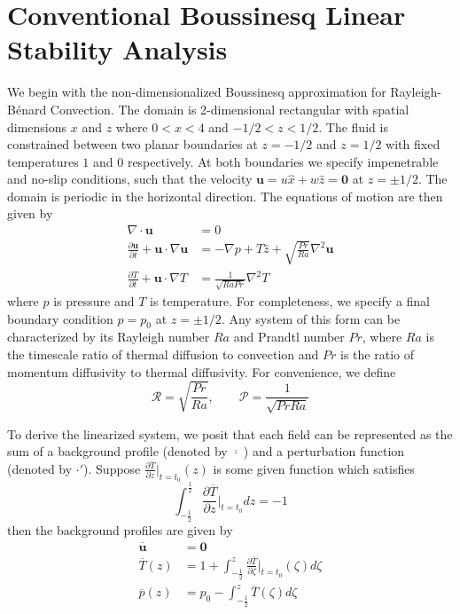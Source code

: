 \documentclass[twocolumn,showpacs,amsmath,amssymb]{revtex4}
\def\hat{\widehat}
\def\bar{\overline}
\begin{document}
\section{Conventional Boussinesq Linear Stability Analysis}\label{sec:boussinesq}
We begin with the non-dimensionalized Boussinesq approximation for Rayleigh-Bénard Convection. The domain is 2-dimensional rectangular with spatial dimensions $x$ and $z$ where $0 < x < 4$ and $-1/2 < z < 1/2$. The fluid is constrained between two planar boundaries at $z = -1/2$ and $z = 1/2$ with fixed temperatures $1$ and $0$ respectively. At both boundaries we specify impenetrable and no-slip conditions, such that the velocity $\mathbf{u} = u \hat{x} + w \hat{z} = \mathbf{0}$ at $z = \pm 1/2$. The domain is periodic in the horizontal direction. The equations of motion are then given by
\begin{align}
    \nabla \cdot \mathbf{u} &= 0 \label{EQ:motion1}\\
    \frac{\partial \mathbf{u}}{\partial t} + \mathbf{u} \cdot \nabla \mathbf{u} &= - \nabla p + T \hat{z} + \sqrt{\frac{Pr}{Ra}} \nabla^2 \mathbf{u} \label{EQ:motion2}\\
    \frac{\partial T}{\partial t} + \mathbf{u} \cdot \nabla T &= \frac{1}{\sqrt{RaPr}} \nabla^2 T \label{EQ:motion3}
\end{align}
where $p$ is pressure and $T$ is temperature. For completeness, we specify a final boundary condition $p = p_0$ at $z = \pm 1/2$. Any system of this form can be characterized by its Rayleigh number $Ra$ and Prandtl number $Pr$, where $Ra$ is the timescale ratio of thermal diffusion to convection and $Pr$ is the ratio of momentum diffusivity to thermal diffusivity.  For convenience, we define 
\begin{equation}
\mathcal{R} = \sqrt{\frac{Pr}{Ra}}, \qquad \mathcal{P} = \frac{1}{\sqrt{Pr Ra}}
\end{equation}
\par To derive the linearized system, we posit that each field can be represented as the sum of a background profile (denoted by $\bar{\cdot } \;$) and a perturbation function (denoted by $\cdot'$). Suppose $\frac{\partial \bar{T}}{\partial z}\big|_{t=t_0} (z)$ is some given function which satisfies
\begin{equation}
    \int_{-\frac{1}{2}}^{\frac{1}{2}} \frac{\partial \bar{T}}{\partial z}\Big|_{t=t_0} dz = -1
\end{equation}
then the background profiles are given by
\begin{align}
    \mathbf{\bar{u}} &= \mathbf{0} \\
    \bar{T}(z) &= 1 + \int_{-\frac{1}{2}}^{z} \frac{\partial \bar{T}}{\partial \zeta}\Big|_{t=t_0}(\zeta) d\zeta \\
    \bar{p}(z) &= p_0 - \int_{-\frac{1}{2}}^z \bar{T}(\zeta) d\zeta
\end{align}
\end{document}

